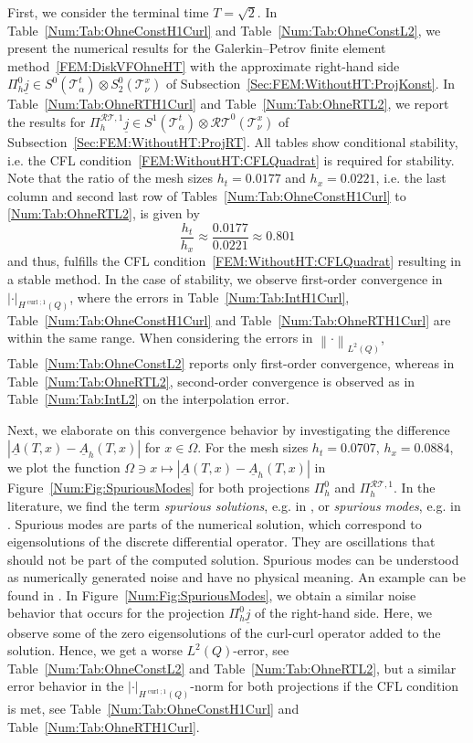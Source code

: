 \documentclass[a4paper,11pt]{article}
\newcommand{\cu}{\operatorname{curl}}
\renewcommand{\vec}[1]{\underline{#1}}
\newcommand{\abs}[1]{\left\lvert{#1}\right\rvert}
\newcommand{\norm}[1]{{\left\lVert{#1}\right\rVert}}
\begin{document}
First, we consider the terminal time $T=\sqrt{2}$. In Table~\ref{Num:Tab:OhneConstH1Curl} and Table~\ref{Num:Tab:OhneConstL2}, we present the numerical results for the Galerkin--Petrov finite element method~\eqref{FEM:DiskVFOhneHT} with the approximate right-hand side $\Pi_h^0 \vec j \in S^0(\mathcal T^t_\alpha) \otimes S_2^0(\mathcal T^x_\nu)$ of Subsection~\ref{Sec:FEM:WithoutHT:ProjKonst}. In Table~\ref{Num:Tab:OhneRTH1Curl} and Table~\ref{Num:Tab:OhneRTL2}, we report the results for $\Pi_h^{\mathcal{RT},1} \vec j  \in S^1(\mathcal T^t_\alpha) \otimes \mathcal{RT}^0(\mathcal T^x_\nu)$ of Subsection~\ref{Sec:FEM:WithoutHT:ProjRT}. All tables show conditional stability, i.e. the CFL condition~\eqref{FEM:WithoutHT:CFLQuadrat} is required for stability. Note that the ratio of the mesh sizes $h_t=0.0177$ and $h_x=0.0221$, i.e. the last column and second last row of Tables~\ref{Num:Tab:OhneConstH1Curl} to \ref{Num:Tab:OhneRTL2}, is given by
\begin{equation*}
	\frac{h_t}{h_x} \approx \frac{0.0177}{0.0221} \approx 0.801
\end{equation*}
and thus, fulfills the CFL condition~\eqref{FEM:WithoutHT:CFLQuadrat} resulting in a stable method. In the case of stability, we observe first-order convergence in $\abs{\cdot}_{H^{\cu;1}(Q)}$, where the errors in Table~\ref{Num:Tab:IntH1Curl}, Table~\ref{Num:Tab:OhneConstH1Curl} and Table~\ref{Num:Tab:OhneRTH1Curl} are within the same range. When considering the errors in $\norm{\cdot}_{L^2(Q)}$, Table~\ref{Num:Tab:OhneConstL2} reports only first-order convergence, whereas in Table~\ref{Num:Tab:OhneRTL2}, second-order convergence is observed as in  Table~\ref{Num:Tab:IntL2} on the interpolation error.

Next, we elaborate on this convergence behavior by investigating the difference $|\vec A(T,x)- \vec A_h(T,x)|$ for $x \in \Omega$. For the mesh sizes $h_t =  0.0707 $, $h_x =  0.0884$, we plot the function $\Omega \ni x \mapsto |\vec A(T,x)- \vec A_h(T,x)|$ in Figure~\ref{Num:Fig:SpuriousModes} for both projections $\Pi_h^0 $ and $\Pi_h^{\mathcal{RT},1}.$ In the literature, we find the term \textit{spurious solutions}, e.g. in \cite{Jin}, or \textit{spurious modes}, e.g. in \cite{bossavit1990}. Spurious modes are parts of the numerical solution, which correspond to eigensolutions of the discrete differential operator. They are oscillations that should not be part of the computed solution. Spurious modes can be understood as numerically generated noise and have no physical meaning. An example can be found in  \cite[Figure~5.8]{Jin}. In Figure~\ref{Num:Fig:SpuriousModes}, we obtain a similar noise behavior that occurs for the projection $\Pi_h^0 \vec j$ of the right-hand side. Here, we observe some of the zero eigensolutions of the curl-curl operator added to the solution. Hence, we get a worse $L^2(Q)$-error, see Table~\ref{Num:Tab:OhneConstL2} and Table~\ref{Num:Tab:OhneRTL2}, but a similar error behavior in the $\abs{\cdot}_{H^{\cu;1}(Q)}$-norm for both projections if the CFL condition is met, see Table~\ref{Num:Tab:OhneConstH1Curl} and Table~\ref{Num:Tab:OhneRTH1Curl}.
\end{document}
